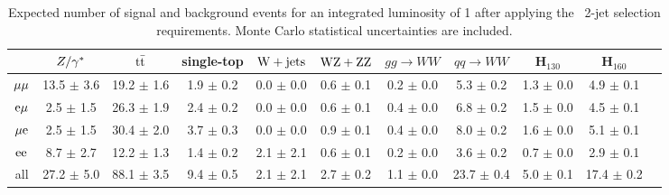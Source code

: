 \begin{table}[!ht]
  \begin{center}
 {\scriptsize
  \begin{tabular} {|c|c|c|c|c|c|c|c|c|c|c|}
\hline
  & $Z/\gamma^*$ & $\mathrm{t}\bar{\mathrm{t}}$ & single-top & $\mathrm{W+jets}$ & $\mathrm{W}\mathrm{Z}+\mathrm{Z}\mathrm{Z}$ & $gg \to WW$ & $qq \to WW$ & H$_{130}$ &   H$_{160}$ \\
  \hline
  \hline
  $\mu\mu$   & 13.5 $\pm$   3.6 & 19.2 $\pm$   1.6 &  1.9 $\pm$   0.2 &   0.0 $\pm$  0.0 &  0.6  $\pm$	 0.1 &  0.2 $\pm$   0.0 &  5.3 $\pm$   0.2 &  1.3 $\pm$   0.0 &  4.9 $\pm$ 0.1 \\
  $\mathrm{e}\mu$   &  2.5 $\pm$   1.5 & 26.3 $\pm$   1.9 &  2.4 $\pm$   0.2 &   0.0 $\pm$  0.0 &  0.6  $\pm$	 0.1 &  0.4 $\pm$   0.0 &  6.8 $\pm$   0.2 &  1.5 $\pm$   0.0 &  4.5 $\pm$ 0.1 \\
  $\mu\mathrm{e}$   &  2.5 $\pm$   1.5 & 30.4 $\pm$   2.0 &  3.7 $\pm$   0.3 &   0.0 $\pm$  0.0 &  0.9  $\pm$	 0.1 &  0.4 $\pm$   0.0 &  8.0 $\pm$   0.2 &  1.6 $\pm$   0.0 &  5.1 $\pm$ 0.1 \\
  $\mathrm{e}\mathrm{e}$   &  8.7 $\pm$   2.7 & 12.2 $\pm$   1.3 &  1.4 $\pm$   0.2 &   2.1 $\pm$  2.1 &  0.6  $\pm$	 0.1 &  0.2 $\pm$   0.0 &  3.6 $\pm$   0.2 &  0.7 $\pm$   0.0 &  2.9 $\pm$ 0.1 \\
  \hline
       all & 27.2 $\pm$   5.0 & 88.1 $\pm$   3.5 &  9.4 $\pm$   0.5 &   2.1 $\pm$  2.1 &  2.7  $\pm$	 0.2 &  1.1 $\pm$   0.0 & 23.7 $\pm$   0.4 &  5.0 $\pm$   0.1 & 17.4 $\pm$ 0.2 \\
 \hline
  \end{tabular}
  }
  \caption{Expected number of signal and background events for an 
  integrated luminosity of 1\ifb{} after applying the \ww\ 
  2-jet selection requirements. Monte Carlo statistical 
  uncertainties are included.}
   \label{tab:wwselection2}
  \end{center}
\end{table}

